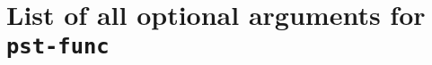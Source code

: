 \documentclass[11pt,english,BCOR10mm,DIV12,bibliography=totoc,parskip=false,
   smallheadings, headexclude,footexclude,oneside]{pst-doc}
\begin{document}
{\clearpage
\section{List of all optional arguments for \texttt{pst-func}}





\bgroup
\raggedright
\nocite{*}


\egroup

\printindex
\end{document}
